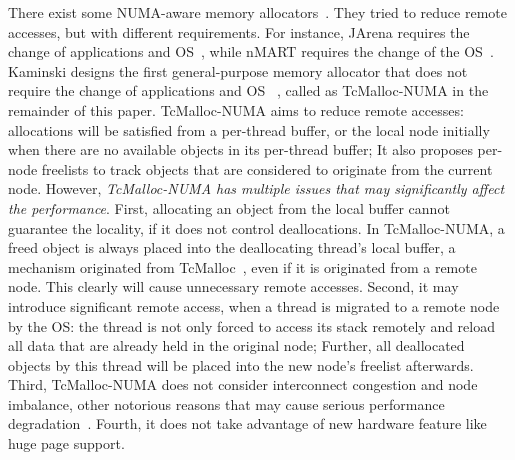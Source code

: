 There exist some NUMA-aware memory allocators~\cite{tcmallocnew, kim2013node, yang2019jarena}. They tried to reduce remote accesses, but with different requirements. For instance, JArena requires the change of applications and OS~\cite{yang2019jarena}, while nMART requires the change of the OS~\cite{kim2013node}.  Kaminski designs the first general-purpose memory allocator that does not require the change of applications and OS ~\cite{tcmallocnew}, called as TcMalloc-NUMA in the remainder of this paper. TcMalloc-NUMA aims to reduce remote accesses: allocations will be satisfied from a per-thread buffer, or the local node initially when there are no available objects in its per-thread buffer; It also proposes per-node freelists to track objects that are considered to originate from the current node. However, \textit{TcMalloc-NUMA has multiple issues that may significantly affect the performance}. First, allocating an object from the local buffer cannot guarantee the locality, if it does not control deallocations. In TcMalloc-NUMA, a freed object is always placed into the deallocating thread's local buffer, a mechanism originated from TcMalloc~\cite{tcmalloc}, even if it is originated from a remote node. This clearly will cause unnecessary remote accesses. %
 Second, it may introduce significant remote access, when a thread is migrated to a remote node by the OS: the thread is not only forced to access its stack remotely and reload all data that are already held in the original node; Further, all deallocated objects by this thread will be placed into the new node's freelist afterwards. %
 Third, TcMalloc-NUMA does not consider interconnect congestion and node imbalance, other notorious reasons that may cause serious performance degradation~\cite{Blagodurov:2011:CNC:2002181.2002182}. %
 Fourth, it does not take advantage of new hardware feature like huge page support. %


